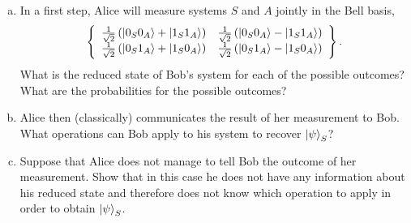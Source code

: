 \documentclass[a4paper,11pt]{article}
\begin{document}
\begin{enumerate}[a)]
\item
In a first step, Alice will measure systems $S$ and $A$ jointly in the Bell basis,
\begin{equation}
\left\{\begin{array}{lr}
\frac{1}{\sqrt 2} \left( \ket{0_S 0_A} + \ket{1_S 1_A} \right) & \frac{1}{\sqrt 2}  \left( \ket{0_S 0_A} - \ket{1_S 1_A} \right)  \\
\frac{1}{\sqrt 2} \left( \ket{0_S 1_A} + \ket{1_S 0_A} \right) & \frac{1}{\sqrt 2}  \left( \ket{0_S 1_A} - \ket{1_S 0_A} \right) 
\end{array}\right\}.
\end{equation}
What is the reduced state of Bob's system for each of the possible
outcomes? What are the probabilities for the possible outcomes?

\item Alice then (classically) communicates the result of her measurement to
Bob.  What operations can Bob apply to his system to recover $\ket\psi_S$?

\item Suppose that Alice does not manage to tell Bob the outcome of her
measurement. Show that in this case he does not have any information about his
reduced state and therefore does not know which operation to apply in order to
obtain $\ket\psi_S$.

\end{enumerate}
\end{document}
